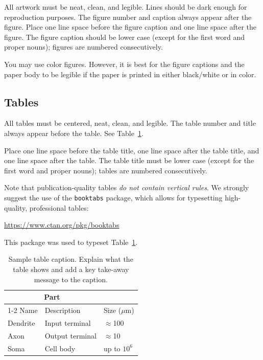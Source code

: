 \documentclass{article}
\begin{document}
All artwork must be neat, clean, and legible. Lines should be dark enough for
 reproduction purposes. The figure number and caption always appear after the
figure. Place one line space before the figure caption and one line space after
the figure. The figure caption should be lower case (except for the first word and proper nouns); figures are numbered consecutively.


You may use color figures.  However, it is best for the figure captions and the
paper body to be legible if the paper is printed in either black/white or in
color.


\subsection{Tables}


All tables must be centered, neat, clean, and legible.  The table number and
title always appear before the table.  See Table~\ref{sample-table}.


Place one line space before the table title, one line space after the
table title, and one line space after the table. The table title must
be lower case (except for the first word and proper nouns); tables are
numbered consecutively.


Note that publication-quality tables \emph{do not contain vertical rules}. We
strongly suggest the use of the \verb+booktabs+ package, which allows for
typesetting high-quality, professional tables:
\begin{center}
  \url{https://www.ctan.org/pkg/booktabs}
\end{center}
This package was used to typeset Table~\ref{sample-table}.


\begin{table}
  \caption{Sample table caption. Explain what the table shows and add a key take-away message to the caption.}
  \label{sample-table}
  \centering
  \begin{tabular}{lll}
    \toprule
    \multicolumn{2}{c}{Part}                   \\
    \cmidrule(r){1-2}
    Name     & Description     & Size ($\mu$m) \\
    \midrule
    Dendrite & Input terminal  & $\approx$100     \\
    Axon     & Output terminal & $\approx$10      \\
    Soma     & Cell body       & up to $10^6$  \\
    \bottomrule
  \end{tabular}
\end{table}
\end{document}
